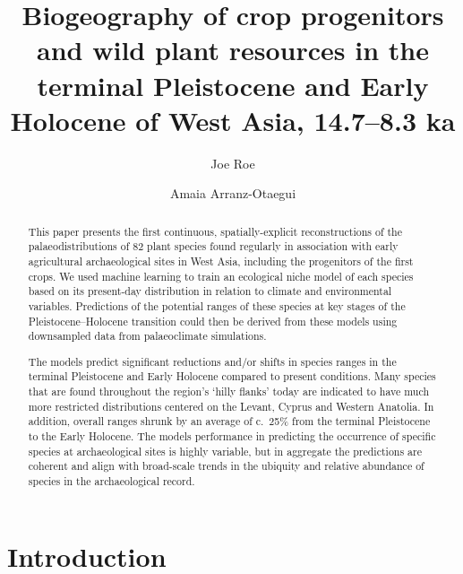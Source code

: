\documentclass[
  authoryear,
  preprint]{elsarticle}
\begin{document}
\begin{frontmatter}
\title{Biogeography of crop progenitors and wild plant resources in the
terminal Pleistocene and Early Holocene of West Asia, 14.7--8.3 ka}
\author[1,2]{Joe Roe%
%
}
\author[3]{Amaia Arranz-Otaegui%
%
}





        
\begin{abstract}
This paper presents the first continuous, spatially-explicit
reconstructions of the palaeodistributions of 82 plant species found
regularly in association with early agricultural archaeological sites in
West Asia, including the progenitors of the first crops. We used machine
learning to train an ecological niche model of each species based on its
present-day distribution in relation to climate and environmental
variables. Predictions of the potential ranges of these species at key
stages of the Pleistocene--Holocene transition could then be derived
from these models using downsampled data from palaeoclimate simulations.

The models predict significant reductions and/or shifts in species
ranges in the terminal Pleistocene and Early Holocene compared to
present conditions. Many species that are found throughout the region's
`hilly flanks' today are indicated to have much more restricted
distributions centered on the Levant, Cyprus and Western Anatolia. In
addition, overall ranges shrunk by an average of c.~25\% from the
terminal Pleistocene to the Early Holocene. The models performance in
predicting the occurrence of specific species at archaeological sites is
highly variable, but in aggregate the predictions are coherent and align
with broad-scale trends in the ubiquity and relative abundance of
species in the archaeological record.
\end{abstract}





\end{frontmatter}
    

\section{Introduction}\label{introduction}
\end{document}
